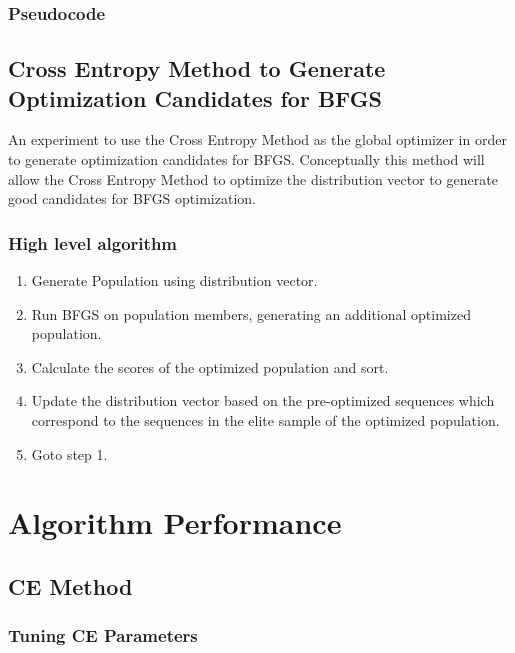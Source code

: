\documentclass[conference,letterpaper]{IEEEtran}
\begin{document}
\subsubsection{Pseudocode}


\subsection{Cross Entropy Method to Generate Optimization Candidates for BFGS}
\par An experiment to use the Cross Entropy Method as the global optimizer in order to generate optimization candidates for BFGS. Conceptually this method will allow the Cross Entropy Method to optimize the distribution vector to generate good candidates for BFGS optimization.
\subsubsection{High level algorithm}
\begin{enumerate}
    \item Generate Population using distribution vector.
    \item Run BFGS on population members, generating an additional optimized population.
    \item Calculate the scores of the optimized population and sort.
    \item Update the distribution vector based on the pre-optimized sequences which correspond to the sequences in the elite sample of the optimized population.
    \item Goto step 1.
\end{enumerate}

\section{Algorithm Performance}
\subsection{CE Method}
\subsubsection{Tuning CE Parameters}

\end{document}

